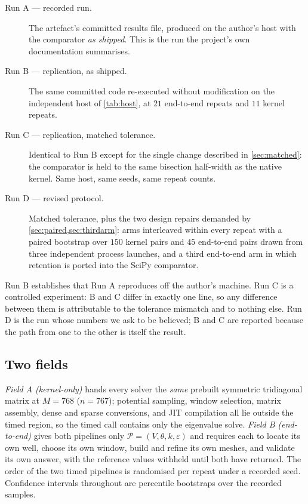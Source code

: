 \documentclass[twocolumn,10pt,a4paper]{article}
\theoremstyle{plain}
\theoremstyle{definition}
\newcommand{\eps}{\varepsilon}
\begin{document}
\begin{description}
\item[Run A --- recorded run.] The artefact's committed results file, produced
on the author's host with the comparator \emph{as shipped}. This is the run the
project's own documentation summarises.
\item[Run B --- replication, as shipped.] The same committed code re-executed
without modification on the independent host of \cref{tab:host}, at $21$
end-to-end repeats and $11$ kernel repeats.
\item[Run C --- replication, matched tolerance.] Identical to Run B except for
the single change described in \cref{sec:matched}: the comparator is held to the
same bisection half-width as the native kernel. Same host, same seeds, same
repeat counts.
\item[Run D --- revised protocol.] Matched tolerance, plus the two design
repairs demanded by \cref{sec:paired,sec:thirdarm}: arms interleaved within
every repeat with a paired bootstrap over $150$ kernel pairs and $45$
end-to-end pairs drawn from three independent process launches, and a third
end-to-end arm in which retention is ported into the SciPy comparator.
\end{description}

Run B establishes that Run A reproduces off the author's machine. Run C is a
controlled experiment: B and C differ in exactly one line, so any difference
between them is attributable to the tolerance mismatch and to nothing else. Run
D is the run whose numbers we ask to be believed; B and C are reported because
the path from one to the other is itself the result.

\subsection{Two fields}

\emph{Field A (kernel-only)} hands every solver the \emph{same} prebuilt
symmetric tridiagonal matrix at $M = 768$ ($n = 767$); potential sampling, window
selection, matrix assembly, dense and sparse conversions, and JIT compilation
all lie outside the timed region, so the timed call contains only the eigenvalue
solve. \emph{Field B (end-to-end)} gives both pipelines only
$\mathcal{P} = (V,\theta,k,\eps)$ and requires each to locate its own well,
choose its own window, build and refine its own meshes, and validate its own
answer, with the reference values withheld until both have returned. The order
of the two timed pipelines is randomised per repeat under a recorded seed.
Confidence intervals throughout are percentile bootstraps
\citep{efron1979} over the recorded samples.
\end{document}
